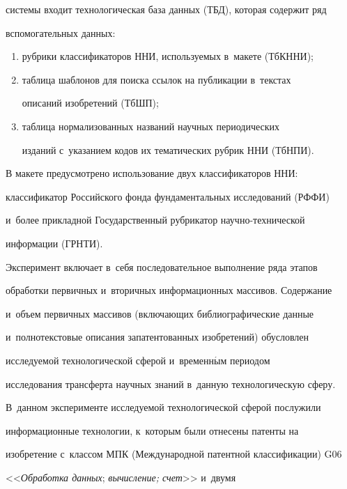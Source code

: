 системы входит технологическая база данных (ТБД), которая содержит ряд 


вспомогательных данных:


     \begin{enumerate}[(1)]


\item рубрики классификаторов ННИ, используемых в~макете (ТбКННИ);


\item таблица шаблонов для поиска ссылок на публикации в~текстах 


описаний изобретений (ТбШП);


\item таблица нормализованных названий научных периодических 


изданий с~указанием кодов их тематических рубрик ННИ (ТбНПИ).


     \end{enumerate}


     


     В макете предусмотрено использование двух классификаторов ННИ: 


классификатор Российского фонда фундаментальных исследований (РФФИ) 


и~более прикладной Государственный рубрикатор на\-уч\-но-тех\-ни\-че\-ской 


информации (\mbox{ГРНТИ}).


     


     Эксперимент включает в~себя последовательное выполнение ряда этапов 


обработки первичных и~вторичных информационных массивов. Содержание 


и~объем первичных массивов (включающих библиографические данные 


и~полнотекстовые описания запатентованных изобретений) обусловлен 


исследуемой технологической сферой и~временн$\acute{\mbox{ы}}$м периодом 


исследования трансферта научных знаний в~данную технологическую сферу. 


В~данном эксперименте исследуемой технологической сферой послужили 


информационные технологии, к~которым были отнесены патенты на 


изобретение с~классом МПК (Международной патентной классификации) G06 


<<\textit{Обработка данных}; \textit{вычисление; счет}>> и~двумя 


